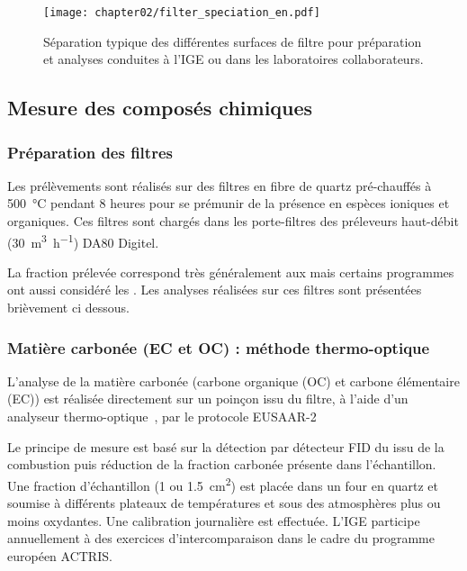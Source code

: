 \begin{figure}[ht]
    \centering
    \texttt{[image: chapter02/filter\_speciation\_en.pdf]}
    \caption{Séparation typique des différentes surfaces de filtre pour préparation et
    analyses conduites à l'IGE ou dans les laboratoires collaborateurs.}%
    \label{fig:chapter02/filter_speciation_en}
\end{figure}

\subsection{Mesure des composés chimiques}%
\label{sub:analyses_des_composés}

\subsubsection{Préparation des filtres}%
\label{sub:préparation_des_filtres}

Les prélèvements sont réalisés sur des filtres en fibre de quartz pré-chauffés à
\SI{500}{\degreeCelsius} pendant 8 heures pour se prémunir de la présence en espèces
ioniques et organiques. Ces filtres sont chargés dans les porte-filtres des préleveurs
haut-débit (\SI{30}{\cubic\m\per\hour}) DA80 Digitel.

La fraction prélevée correspond très généralement aux \PMdix{} mais certains programmes
ont aussi considéré les \PMdc.
Les analyses réalisées sur ces filtres sont présentées brièvement ci dessous.

\subsubsection{Matière carbonée (EC et OC) : méthode thermo-optique}%
\label{ssub:matière_carbonnée_ec_et_oc_}

L’analyse de la matière carbonée (carbone organique (OC) et carbone élémentaire (EC)) est
réalisée directement sur un poinçon issu du filtre, à l’aide d’un analyseur
thermo-optique~\autocite[Sunset Lab. Analyser]{birchElemental1996}, par le protocole
EUSAAR-2~\autocite{cavalliStandardised2010,cenAmbient2017a}

Le principe de mesure est basé sur la détection par détecteur FID du  issu de la
combustion puis réduction de la fraction carbonée présente dans l’échantillon. Une
fraction d'échantillon (1 ou \SI{1.5}{\centi\m\squared}) est placée dans un four en quartz
et soumise à différents plateaux de températures et sous des atmosphères plus ou moins
oxydantes. Une calibration journalière est effectuée. L’IGE participe annuellement à des
exercices d’intercomparaison dans le cadre du programme européen ACTRIS.

